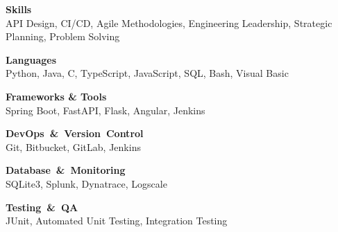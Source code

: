 \documentclass[10pt,a4paper]{article}
\begin{document}
\begin{minipage}[t]{0.30\textwidth}
\RaggedRight  %

\setlength{\parskip}{0.5em} %

\textbf{Skills}\\
API Design, CI/CD, Agile Methodologies, Engineering Leadership, Strategic Planning, Problem Solving

\vspace{0.5cm}

\textbf{Languages}\\
Python, Java, C, TypeScript, JavaScript, SQL, Bash, Visual Basic

\vspace{0.5cm}

\textbf{Frameworks \& Tools}\\
Spring Boot, FastAPI, Flask, Angular, Jenkins

\vspace{0.5cm}

\textbf{DevOps~\&~Version~Control}\\
Git, Bitbucket, GitLab, Jenkins

\vspace{0.5cm}

\textbf{Database~\&~Monitoring}\\
SQLite3, Splunk, Dynatrace, Logscale

\vspace{0.5cm}

\textbf{Testing~\&~QA}\\
JUnit, Automated Unit Testing, Integration Testing

\end{minipage}
\end{document}
